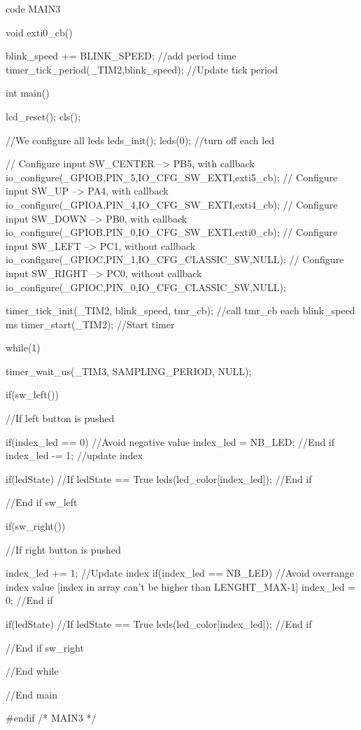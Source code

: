 \begin{Cpp}{code MAIN3}
{}


void exti0_cb()
{
    blink_speed += BLINK_SPEED;         //add period time
	timer_tick_period(_TIM2,blink_speed);   //Update tick period

}

int main()
{
    lcd_reset(); cls();
    
    //We configure all leds
    leds_init();
    leds(0); //turn off each led
    
	// Configure input SW_CENTER --> PB5, with callback
	io_configure(_GPIOB,PIN_5,IO_CFG_SW_EXTI,exti5_cb);
    // Configure input SW_UP --> PA4, with callback
	io_configure(_GPIOA,PIN_4,IO_CFG_SW_EXTI,exti4_cb);
    // Configure input SW_DOWN --> PB0, with callback
	io_configure(_GPIOB,PIN_0,IO_CFG_SW_EXTI,exti0_cb);
    // Configure input SW_LEFT --> PC1, without callback
	io_configure(_GPIOC,PIN_1,IO_CFG_CLASSIC_SW,NULL);	
	// Configure input SW_RIGHT --> PC0, without callback
	io_configure(_GPIOC,PIN_0,IO_CFG_CLASSIC_SW,NULL);

    

    timer_tick_init(_TIM2, blink_speed, tmr_cb);  //call tmr_cb each blink_speed ms
	timer_start(_TIM2);                             //Start timer 

	while(1) {
	
        timer_wait_us(_TIM3, SAMPLING_PERIOD, NULL);
        
		if(sw_left()) {  //If left button is pushed

			if(index_led == 0) { //Avoid negative value
				index_led = NB_LED;
			}//End if
			index_led -= 1; //update index

			if(ledState) {  //If ledState == True
				leds(led_color[index_led]);
			}//End if
				
		}//End if sw_left

		if(sw_right()) {  //If right button is pushed

			index_led += 1; //Update index
			if(index_led == NB_LED) { //Avoid overrange index value [index in array can't be higher than LENGHT_MAX-1]
				index_led = 0;
			}//End if
				
			if(ledState) {       //If ledState == True
				leds(led_color[index_led]);
			}//End if
				
		}//End if sw_right

    }//End while    
}//End main

#endif /* MAIN3 */



\end{Cpp}